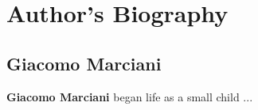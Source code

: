 \chapter*{Author's Biography}

\section*{Giacomo Marciani}

\textbf{Giacomo Marciani} began life as a small child ...
